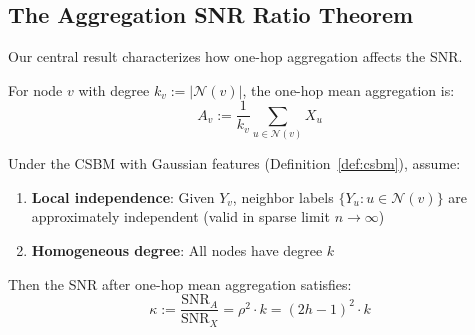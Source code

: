 \subsection{The Aggregation SNR Ratio Theorem}
\label{subsec:snr_ratio}

Our central result characterizes how one-hop aggregation affects the SNR.

\begin{definition}
\label{def:aggregation}
For node $v$ with degree $k_v := |\mathcal{N}(v)|$, the one-hop mean aggregation is:
\begin{equation}
    A_v := \frac{1}{k_v} \sum_{u \in \mathcal{N}(v)} X_u
\end{equation}
\end{definition}

\begin{theorem}
\label{thm:snr_ratio}
Under the CSBM with Gaussian features (Definition~\ref{def:csbm}), assume:
\begin{enumerate}
    \item[(A1)] \textbf{Local independence}: Given $Y_v$, neighbor labels $\{Y_u : u \in \mathcal{N}(v)\}$ are approximately independent (valid in sparse limit $n \to \infty$)
    \item[(A2)] \textbf{Homogeneous degree}: All nodes have degree $k$
\end{enumerate}
Then the SNR after one-hop mean aggregation satisfies:
\begin{equation}
    \kappa := \frac{\mathrm{SNR}_A}{\mathrm{SNR}_X} = \rho^2 \cdot k = (2h-1)^2 \cdot k
\end{equation}
\end{theorem}

